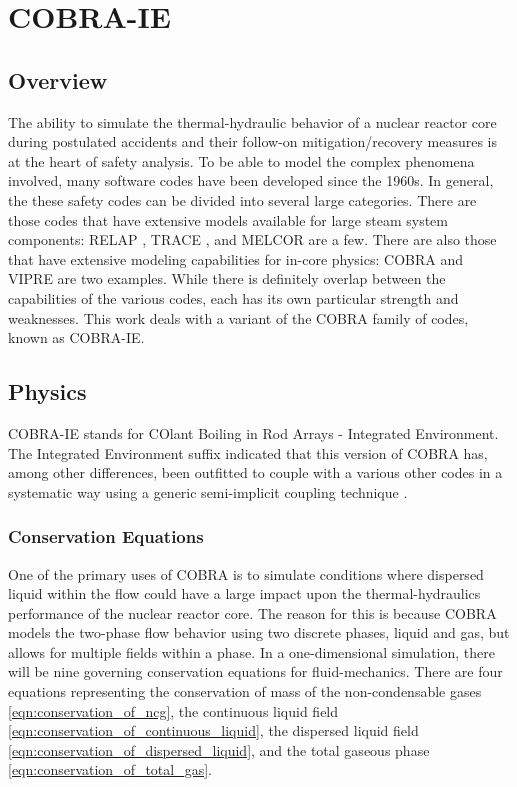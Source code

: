 \chapter{COBRA-IE}
\label{chap:cobra}

\section{Overview}
\label{sect:cobra_overview}
The ability to simulate the thermal-hydraulic behavior of a nuclear reactor core during postulated accidents and their follow-on mitigation/recovery measures is at the heart of safety analysis.
To be able to model the complex phenomena involved, many software codes have been developed since the 1960s.
In general, the these safety codes can be divided into several large categories. There are those codes that have extensive models available for large steam system components: RELAP \cite{RELAP}, TRACE \cite{TRACE}, and MELCOR are a few.
There are also those that have extensive modeling capabilities for in-core physics: COBRA \cite{Thurgood1983c} and VIPRE are two examples.
While there is definitely overlap between the capabilities of the various codes, each has its own particular strength and weaknesses.
This work deals with a variant of the COBRA family of codes, known as COBRA-IE.

\section{Physics}
\label{sect:cobra_physics}
COBRA-IE stands for COlant Boiling in Rod Arrays - Integrated Environment.
The Integrated Environment suffix indicated that this version of COBRA has, among other differences, been outfitted to couple with a various other codes in a systematic way using a generic semi-implicit coupling technique \cite{Weaver2002}.

\subsection{Conservation Equations}
One of the primary uses of COBRA is to simulate conditions where dispersed liquid within the flow could have a large impact upon the thermal-hydraulics performance of the nuclear reactor core.
The reason for this is because COBRA models the two-phase flow behavior using two discrete phases, liquid and gas, but allows for multiple fields within a phase.
In a one-dimensional simulation, there will be nine governing conservation equations for fluid-mechanics.
There are four equations representing the conservation of mass of the non-condensable gases \eqref{eqn:conservation_of_ncg}, the continuous liquid field \eqref{eqn:conservation_of_continuous_liquid}, the dispersed liquid field \eqref{eqn:conservation_of_dispersed_liquid}, and the total gaseous phase \eqref{eqn:conservation_of_total_gas}. 

